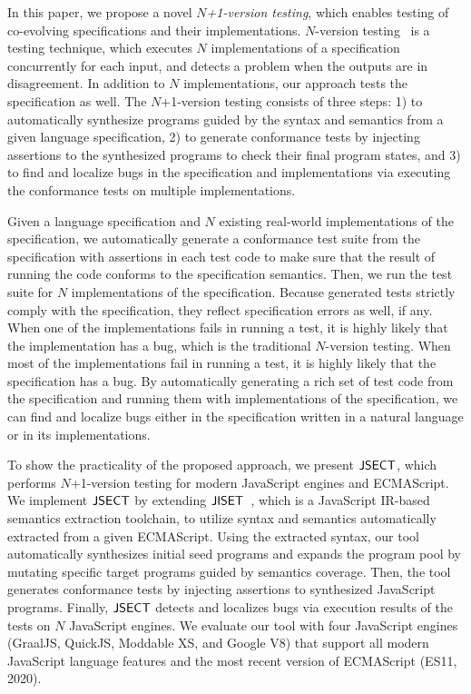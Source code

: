 In this paper, we propose a novel \textit{$N$+1-version testing},
which enables testing of co-evolving specifications and their implementations.
$N$-version testing~\cite{nversion} is a testing technique, which
executes $N$ implementations of a specification concurrently for each
input, and detects a problem when the outputs are in disagreement.
In addition to $N$ implementations, our approach tests the
specification as well.  The $N$+1-version testing
consists of three steps: 1) to automatically synthesize
programs guided by the syntax and semantics from a given language
specification, 2) to generate conformance tests by injecting
assertions to the synthesized programs
to check their final program states, and 3) to find and localize bugs in
the specification and implementations via executing the conformance tests on multiple implementations.

Given a language specification and $N$ existing real-world
implementations of the specification, we
automatically generate a conformance test suite from the specification with
assertions in each test code to make sure that the result of running the code
conforms to the specification semantics.  Then, we run the test suite for $N$
implementations of the specification.  Because generated tests strictly comply
with the specification, they reflect specification errors as well, if any.  When
one of the implementations fails in running a test, it is highly likely that the
implementation has a bug, which is the traditional $N$-version testing.  When
most of the implementations fail in running a test, it is highly likely that
the specification has a bug.  By automatically generating a rich set of test
code from the specification and running them with implementations of the
specification, we can find and localize bugs either in the specification written
in a natural language or in its implementations.

To show the practicality of the proposed approach, we present $\text{\sf JSECT}$, which
performs $N$+1-version testing for modern JavaScript engines and ECMAScript.
We implement $\text{\sf JSECT}$ by extending $\text{\sf JISET}$~\cite{jiset}, which is a JavaScript
IR-based semantics extraction toolchain, to utilize syntax and semantics
automatically extracted from a given ECMAScript.  Using the extracted syntax,
our tool automatically synthesizes initial seed programs and expands the program
pool by mutating specific target programs guided by semantics coverage.  Then,
the tool generates conformance tests by injecting assertions to synthesized
JavaScript programs.  Finally, $\text{\sf JSECT}$ detects and localizes bugs via execution
results of the tests on $N$ JavaScript engines.  We evaluate our tool with four
JavaScript engines (GraalJS\cite{graaljs}, QuickJS\cite{qjs}, Moddable
XS\cite{xs}, and Google V8\cite{v8}) that support all modern JavaScript language
features and the most recent version of ECMAScript (ES11, 2020).

